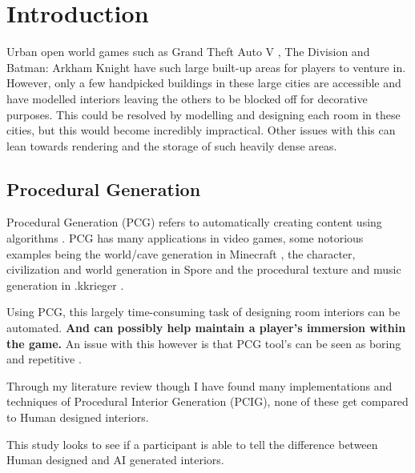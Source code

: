 \section{Introduction}

Urban open world games such as Grand Theft Auto V \cite{game:gta}, The Division \cite{game:division} 
and Batman: Arkham Knight \cite{game:arkham-knight}
have such large built-up areas for players to venture in.
However, only a few handpicked buildings in these large cities are accessible and have 
modelled interiors leaving the others to be blocked off for decorative purposes.
This could be resolved by modelling and designing each room in these cities, 
but this would become incredibly impractical. 
Other issues with this can lean towards rendering and the storage of such heavily dense areas.

\subsection*{Procedural Generation}
Procedural Generation (PCG) refers to automatically creating content using algorithms \cite{what-is-pcg}.
PCG has many applications in video games,
some notorious examples being the world/cave generation in Minecraft \cite{game:minecraft},
the character, civilization and world generation in Spore \cite{game:spore}
and the procedural texture and music generation in .kkrieger \cite{game:kkreiger}.

Using PCG, this largely time-consuming task of designing room interiors can be automated. 
\textbf{And can possibly help maintain a player's immersion within the game. }
An issue with this however is that PCG tool's can be seen as boring and repetitive \cite{pcg_in_gd}.

Through my literature review though I have found many implementations and techniques of Procedural Interior 
Generation (PCIG), none of these get compared to Human designed interiors. 
\bigskip

This study looks to see if a participant is able to tell the difference between Human designed and AI 
generated interiors.

